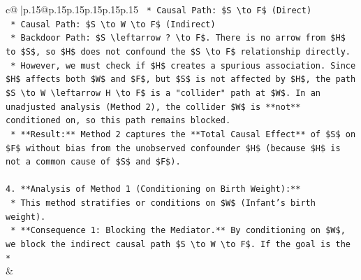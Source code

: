 \documentclass{article}
\begin{document}
{\begin{supertabular}{c@{$\;$}|p{.15\linewidth}@{}p{.15\linewidth}p{.15\linewidth}p{.15\linewidth}p{.15\linewidth}p{.15\linewidth}}
{{{\texttt{        *   Causal Path: \$S \textbackslash{}to F\$ (Direct)} \\
\texttt{        *   Causal Path: \$S \textbackslash{}to W \textbackslash{}to F\$ (Indirect)} \\
\texttt{        *   Backdoor Path: \$S \textbackslash{}leftarrow ? \textbackslash{}to F\$. There is no arrow from \$H\$ to \$S\$, so \$H\$ does not confound the \$S \textbackslash{}to F\$ relationship directly.} \\
\texttt{        *   However, we must check if \$H\$ creates a spurious association. Since \$H\$ affects both \$W\$ and \$F\$, but \$S\$ is not affected by \$H\$, the path \$S \textbackslash{}to W \textbackslash{}leftarrow H \textbackslash{}to F\$ is a "collider" path at \$W\$. In an unadjusted analysis (Method 2), the collider \$W\$ is **not** conditioned on, so this path remains blocked.} \\
\texttt{    *   **Result:** Method 2 captures the **Total Causal Effect** of \$S\$ on \$F\$ without bias from the unobserved confounder \$H\$ (because \$H\$ is not a common cause of \$S\$ and \$F\$).} \\
\\ 
\texttt{4.  **Analysis of Method 1 (Conditioning on Birth Weight):**} \\
\texttt{    *   This method stratifies or conditions on \$W\$ (Infant's birth weight).} \\
\texttt{    *   **Consequence 1: Blocking the Mediator.** By conditioning on \$W\$, we block the indirect causal path \$S \textbackslash{}to W \textbackslash{}to F\$. If the goal is the *} \\
            }
        }
    }
    & \\ \\


\end{supertabular}}
\end{document}

